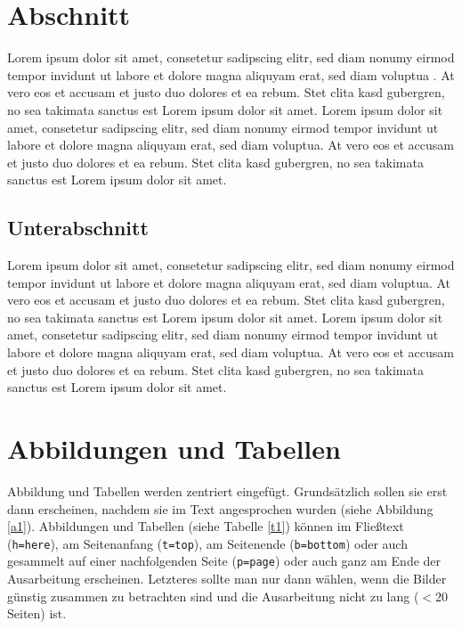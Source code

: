 \section{Abschnitt}

Lorem ipsum dolor sit amet, consetetur sadipscing elitr, sed diam nonumy eirmod tempor invidunt ut labore et dolore magna aliquyam erat, sed diam voluptua \cite{Nannen:03}. At vero eos et accusam et justo duo dolores et ea rebum. Stet clita kasd gubergren, no sea takimata sanctus est Lorem ipsum dolor sit amet. Lorem ipsum dolor sit amet, consetetur sadipscing elitr, sed diam nonumy eirmod tempor invidunt ut labore et dolore magna aliquyam erat, sed diam voluptua. At vero eos et accusam et justo duo dolores et ea rebum. Stet clita kasd gubergren, no sea takimata sanctus est Lorem ipsum dolor sit amet.

\subsection{Unterabschnitt} 

Lorem ipsum dolor sit amet, consetetur sadipscing elitr, sed diam nonumy eirmod tempor invidunt ut labore et dolore magna aliquyam erat, sed diam voluptua. At vero eos et accusam et justo duo dolores et ea rebum. Stet clita kasd gubergren, no sea takimata sanctus est Lorem ipsum dolor sit amet. Lorem ipsum dolor sit amet, consetetur sadipscing elitr, sed diam nonumy eirmod tempor invidunt ut labore et dolore magna aliquyam erat, sed diam voluptua. At vero eos et accusam et justo duo dolores et ea rebum. Stet clita kasd gubergren, no sea takimata sanctus est Lorem ipsum dolor sit amet.

\section{Abbildungen und Tabellen}

Abbildung und Tabellen werden zentriert eingefügt. Grundsätzlich sollen sie erst dann erscheinen, nachdem sie im Text angesprochen wurden (siehe Abbildung \ref{a1}). Abbildungen und Tabellen (siehe Tabelle \ref{t1}) können im Fließtext (\verb|h=here|), am Seitenanfang (\verb|t=top|), am Seitenende (\verb|b=bottom|) oder auch gesammelt auf einer nachfolgenden Seite (\verb|p=page|) oder auch ganz am Ende der Ausarbeitung erscheinen. Letzteres sollte man nur dann wählen, wenn die Bilder günstig zusammen zu betrachten sind und die Ausarbeitung nicht zu lang ($< 20$ Seiten) ist.

